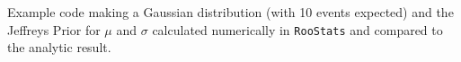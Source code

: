Example code making a Gaussian distribution (with 10 events expected) and the Jeffreys Prior for $\mu$ and $\sigma$ calculated numerically in \texttt{RooStats}  and compared to the analytic result.  